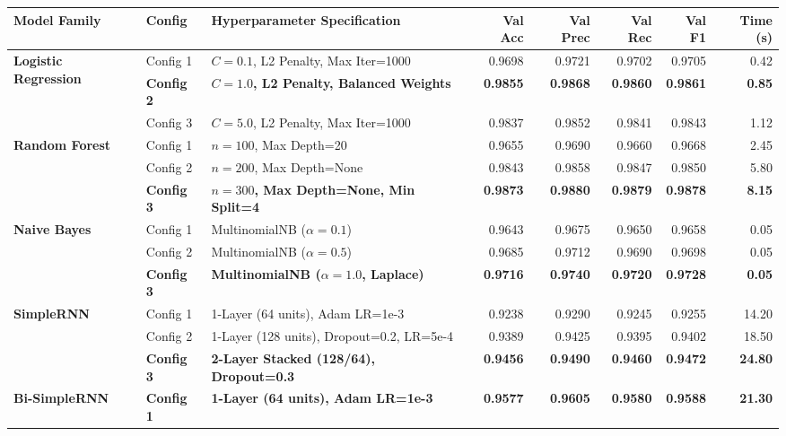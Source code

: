 \documentclass[11pt,a4paper]{article}
\begin{document}
\begin{table}[t]
\centering
\small
\begin{tabularx}{\textwidth}{llXrrrrr}
\toprule
\textbf{Model Family} & \textbf{Config} & \textbf{Hyperparameter Specification} & \textbf{Val Acc} & \textbf{Val Prec} & \textbf{Val Rec} & \textbf{Val F1} & \textbf{Time (s)} \\
\midrule
\multirow{3}{*}{\textbf{Logistic Regression}} 
 & Config 1 & $C=0.1$, L2 Penalty, Max Iter=1000 & 0.9698 & 0.9721 & 0.9702 & 0.9705 & 0.42 \\
 & \textbf{Config 2} & \textbf{$C=1.0$, L2 Penalty, Balanced Weights} & \textbf{0.9855} & \textbf{0.9868} & \textbf{0.9860} & \textbf{0.9861} & \textbf{0.85} \\
 & Config 3 & $C=5.0$, L2 Penalty, Max Iter=1000 & 0.9837 & 0.9852 & 0.9841 & 0.9843 & 1.12 \\
\midrule
\multirow{3}{*}{\textbf{Random Forest}} 
 & Config 1 & $n=100$, Max Depth=20 & 0.9655 & 0.9690 & 0.9660 & 0.9668 & 2.45 \\
 & Config 2 & $n=200$, Max Depth=None & 0.9843 & 0.9858 & 0.9847 & 0.9850 & 5.80 \\
 & \textbf{Config 3} & \textbf{$n=300$, Max Depth=None, Min Split=4} & \textbf{0.9873} & \textbf{0.9880} & \textbf{0.9879} & \textbf{0.9878} & \textbf{8.15} \\
\midrule
\multirow{3}{*}{\textbf{Naive Bayes}} 
 & Config 1 & MultinomialNB ($\alpha=0.1$) & 0.9643 & 0.9675 & 0.9650 & 0.9658 & 0.05 \\
 & Config 2 & MultinomialNB ($\alpha=0.5$) & 0.9685 & 0.9712 & 0.9690 & 0.9698 & 0.05 \\
 & \textbf{Config 3} & \textbf{MultinomialNB ($\alpha=1.0$, Laplace)} & \textbf{0.9716} & \textbf{0.9740} & \textbf{0.9720} & \textbf{0.9728} & \textbf{0.05} \\
\midrule
\multirow{3}{*}{\textbf{SimpleRNN}} 
 & Config 1 & 1-Layer (64 units), Adam LR=1e-3 & 0.9238 & 0.9290 & 0.9245 & 0.9255 & 14.20 \\
 & Config 2 & 1-Layer (128 units), Dropout=0.2, LR=5e-4 & 0.9389 & 0.9425 & 0.9395 & 0.9402 & 18.50 \\
 & \textbf{Config 3} & \textbf{2-Layer Stacked (128/64), Dropout=0.3} & \textbf{0.9456} & \textbf{0.9490} & \textbf{0.9460} & \textbf{0.9472} & \textbf{24.80} \\
\midrule
\multirow{3}{*}{\textbf{Bi-SimpleRNN}} 
 & \textbf{Config 1} & \textbf{1-Layer (64 units), Adam LR=1e-3} & \textbf{0.9577} & \textbf{0.9605} & \textbf{0.9580} & \textbf{0.9588} & \textbf{21.30} \\

\end{tabularx}
\end{table}
\end{document}
